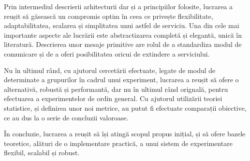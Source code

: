 Prin intermediul descrierii arhitecturii dar și a principiilor folosite, lucrarea a reușit să găsească un compromis optim în ceea ce privește flexibilitate, adaptabilitatea, scalarea și simplitatea unui astfel de serviciu. Una din cele mai importante aspecte ale lucrării este abstractizarea completă și elegantă, unică în literatură. Descrierea unor mesaje primitive are rolul de a standardiza modul de comunicare și de a oferi posibilitatea oricui de extindere a serviciului.

Nu în ultimul rând, cu ajutorul cercetării efectuate, legate de modul de determinate a grupurilor în cadrul unui experiment, lucrarea a reușit să ofere o alternativă, robustă și performantă, dar nu în ultimul rând orignală, pentru efectuarea a experimentelor de ordin general. Cu ajutorul utilizării teoriei statistice, și definirea unor noi metrice, au putut fi efectuate comparații obiective, ce au dus la o serie de concluzii valoroase.

În concluzie, lucrarea a reușit să își atingă scopul propus inițial, și să ofere bazele teoretice, alături de o implementare practică, a unui sistem de experimentare flexibil, scalabil și robust.
